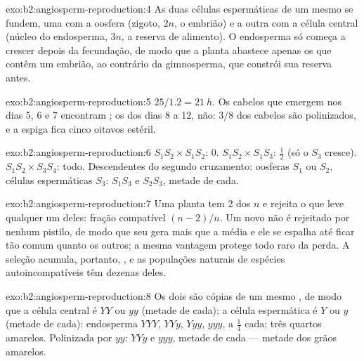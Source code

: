 \begin{solution}{exo:b2:angiosperm-reproduction:4}
As duas células espermáticas de um mesmo  se fundem, uma
com a oosfera (zigoto, $2n$, o embrião) e a outra com a célula central
(núcleo do endosperma, $3n$, a reserva de alimento). O endosperma só
começa a crescer depois da fecundação, de modo que a planta abastece
apenas os  que contêm um embrião, ao contrário da gimnosperma,
que constrói sua reserva antes.
\end{solution}

\begin{solution}{exo:b2:angiosperm-reproduction:5}
$25/1.2 = \qty{21}{h}$. Os cabelos que emergem nos dias 5, 6 e 7
encontram ; os dos dias 8 a 12, não: $3/8$ dos cabelos são
polinizados, e a espiga fica cinco oitavos estéril.
\end{solution}

\begin{solution}{exo:b2:angiosperm-reproduction:6}
$S_1S_2\times S_1S_2$: 0. $S_1S_2\times S_1S_3$: $\tfrac12$ (só o 
$S_3$ cresce). $S_1S_2\times S_3S_4$: todo. Descendentes do segundo
cruzamento: oosferas $S_1$ ou $S_2$, células espermáticas $S_3$:
$S_1S_3$ e $S_2S_3$, metade de cada.
\end{solution}

\begin{solution}{exo:b2:angiosperm-reproduction:7}
Uma planta tem 2 dos $n$  e rejeita o  que leve qualquer um
deles: fração compatível $(n - 2)/n$. Um  novo não é rejeitado por
nenhum pistilo, de modo que seu  gera mais  que a média e
ele se espalha até ficar tão comum quanto os outros; a mesma vantagem
protege todo  raro da perda. A seleção acumula, portanto, ,
e as populações naturais de espécies autoincompatíveis têm dezenas
deles.
\end{solution}

\begin{solution}{exo:b2:angiosperm-reproduction:8}
Os dois  são cópias de um mesmo , de modo que a
célula central é $YY$ ou $yy$ (metade de cada); a célula espermática é
$Y$ ou $y$ (metade de cada): endosperma $YYY$, $YYy$, $Yyy$, $yyy$, a
$\tfrac14$ cada; três quartos amarelos. Polinizada por $yy$: $YYy$ e
$yyy$, metade de cada --- metade dos grãos amarelos.
\end{solution}

